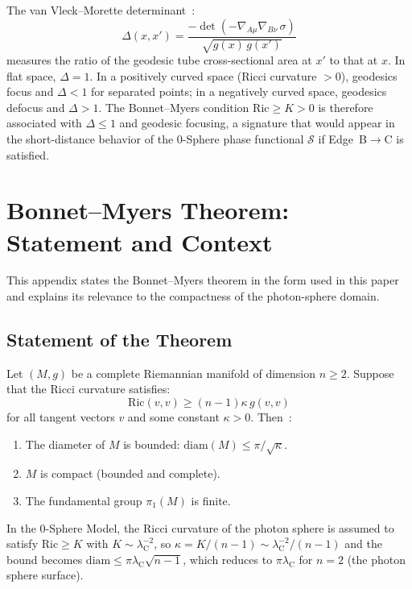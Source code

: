 \documentclass[%
 reprint, amsmath,amssymb, aps, prd, ]{revtex4-2}
\numberwithin{equation}{section}
\newcommand{\lambdaC}{\lambda_{\mathrm{C}}}
\newcommand{\SyngeS}{\mathcal{S}}
\begin{document}
The van Vleck--Morette determinant~\cite{VanVleck1928}:
\begin{equation}
\Delta(x,x') = \frac{-\det(-\nabla_{A\mu}\nabla_{B\nu}\,\sigma)}{\sqrt{g(x)\,g(x')}}
\label{app:eq:vvm}
\end{equation}
measures the ratio of the geodesic tube cross-sectional area at $x'$ to that at $x$.
In flat space, $\Delta = 1$.
In a positively curved space (Ricci curvature $> 0$), geodesics focus and $\Delta < 1$ for separated points; in a negatively curved space, geodesics defocus and $\Delta > 1$.
The Bonnet--Myers condition $\mathrm{Ric} \geq K > 0$ is therefore associated with $\Delta \leq 1$ and geodesic focusing, a signature that would appear in the short-distance behavior of the 0-Sphere phase functional $\SyngeS$ if Edge~B$\to$C is satisfied.

\section{Bonnet--Myers Theorem: Statement and Context}
\label{app:bonnet}

This appendix states the Bonnet--Myers theorem in the form used in this paper and explains its relevance to the compactness of the photon-sphere domain.

\subsection{Statement of the Theorem}

Let $(M, g)$ be a complete Riemannian manifold of dimension $n \geq 2$.
Suppose that the Ricci curvature satisfies:
\begin{equation}
\mathrm{Ric}(v, v) \geq (n-1)\kappa\, g(v,v)
\label{app:eq:bonnet_condition}
\end{equation}
for all tangent vectors $v$ and some constant $\kappa > 0$.
Then~\cite{Myers1941,Chavel2006}:
\begin{enumerate}[label=(\alph*), leftmargin=1.5em]
\item The diameter of $M$ is bounded: $\mathrm{diam}(M) \leq \pi/\sqrt{\kappa}$.
\item $M$ is compact (bounded and complete).
\item The fundamental group $\pi_1(M)$ is finite.
\end{enumerate}
In the 0-Sphere Model, the Ricci curvature of the photon sphere is assumed to satisfy $\mathrm{Ric} \geq K$ with $K \sim \lambdaC^{-2}$, so $\kappa = K/( n-1) \sim \lambdaC^{-2}/(n-1)$ and the bound becomes $\mathrm{diam} \leq \pi\lambdaC\sqrt{n-1}$, which reduces to $\pi\lambdaC$ for $n = 2$ (the photon sphere surface).
\end{document}

